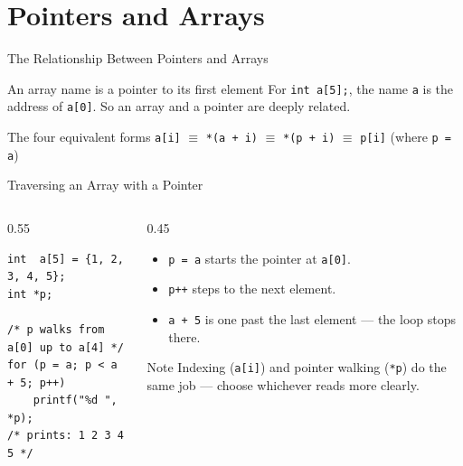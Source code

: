 \documentclass[aspectratio=169]{beamer}
\begin{document}
	\section{Pointers and Arrays}
	\begin{frame}{The Relationship Between Pointers and Arrays}
		\begin{block}{An array name is a pointer to its first element}
			For \texttt{int a[5];}, the name \texttt{a} is the address of \texttt{a[0]}. So an array and a
			pointer are deeply related.
		\end{block}
		\vspace{0.1cm}
		\centering
		\vspace{0.1cm}
		\begin{block}{The four equivalent forms}
			\centering \texttt{a[i]} \;$\equiv$\; \texttt{*(a + i)} \;$\equiv$\; \texttt{*(p + i)} \;$\equiv$\; \texttt{p[i]} \quad (where \texttt{p = a})
		\end{block}
	\end{frame}

	\begin{frame}[fragile]{Traversing an Array with a Pointer}
		\begin{columns}[T]
			\begin{column}{0.55\textwidth}
				\begin{lstlisting}
int  a[5] = {1, 2, 3, 4, 5};
int *p;

/* p walks from a[0] up to a[4] */
for (p = a; p < a + 5; p++)
    printf("%d ", *p);
/* prints: 1 2 3 4 5 */
				\end{lstlisting}
			\end{column}
			\begin{column}{0.45\textwidth}
				\begin{itemize}\small
					\item \texttt{p = a} starts the pointer at \texttt{a[0]}.
					\item \texttt{p++} steps to the next element.
					\item \texttt{a + 5} is one past the last element --- the loop stops there.
				\end{itemize}
				\begin{block}{Note}
					\small Indexing (\texttt{a[i]}) and pointer walking (\texttt{*p}) do the same job --- choose whichever reads more clearly.
				\end{block}
			\end{column}
		\end{columns}
	\end{frame}
\end{document}
